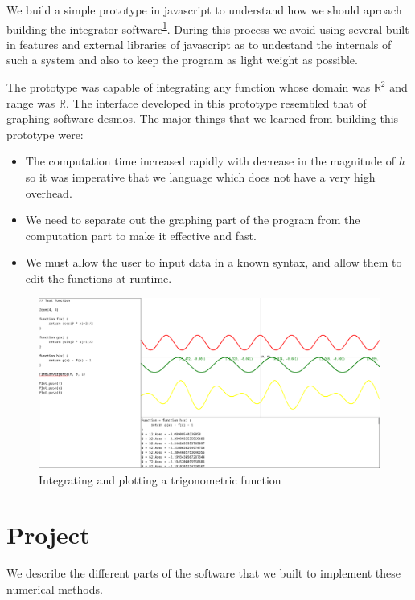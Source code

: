 \documentclass[12pt]{article}
\begin{document}
We build a simple prototype\cite{ae}
in javascript to understand how we should aproach building the integrator software\textsuperscript{\ref{fig:prototype1}}.
During this process we avoid using several built in features and external libraries of javascript as to undestand
the internals of such a system and also to keep the program as light weight as possible.

The prototype was capable of integrating any function whose domain was $\mathbb{R}^2$ and range was $\mathbb{R}$.
The interface developed in this prototype resembled that of graphing software desmos. The major things that we learned
from building this prototype were:
\begin{itemize}
	\item The computation time increased rapidly with decrease in the magnitude of $h$ so it was imperative that
		we language which does not have a very high overhead.

	\item We need to separate out the graphing part of the program from the computation part to make it effective and
		fast.

	\item We must allow the user to input data in a known syntax, and allow them to edit the functions at runtime.
\end{itemize}

\begin{figure}
	\includegraphics[width=\linewidth]{prototype.png}
	\caption{Integrating and plotting a trigonometric function}
	\label{fig:prototype1}
\end{figure}


\section{Project}

We describe the different parts of the software that we built to implement these numerical methods.
\end{document}

